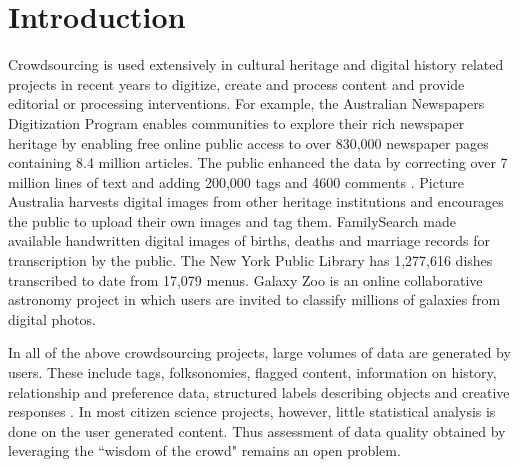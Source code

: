 \documentclass[letterpaper]{article}
\begin{document}
\section{Introduction}
\label{sec:intro}

Crowdsourcing is used extensively in cultural heritage and digital history related projects in recent years to 
digitize, create and process content and provide editorial or processing interventions. For example, the Australian Newspapers Digitization Program \cite{ADNP} enables communities to explore their rich newspaper heritage by enabling free online public access to over 830,000 newspaper pages containing 8.4 million articles. The public enhanced the data by correcting over 7 million lines of text and adding 200,000 tags and 4600 comments \cite{holley_09}. Picture Australia \cite{pictAus} harvests digital images from other heritage institutions and encourages the public to upload their own images and tag them. FamilySearch \cite{famSearch} made available handwritten digital images of births, deaths and marriage records for transcription by the public. The New York Public Library has 1,277,616 dishes transcribed to date from 17,079 menus. Galaxy Zoo \cite{galZoo} is an online collaborative astronomy project in which users are invited to classify millions of galaxies from digital photos. 

In all of the above crowdsourcing projects, large volumes of data are generated by users. These include tags, folksonomies, flagged content, information on history, relationship and preference data, structured labels describing objects and creative responses \cite{Ridge_11}. In most citizen science projects, however, little statistical analysis is done on the user generated content. Thus assessment of data quality obtained by leveraging the ``wisdom of the crowd" remains an open problem. 

\end{document}
